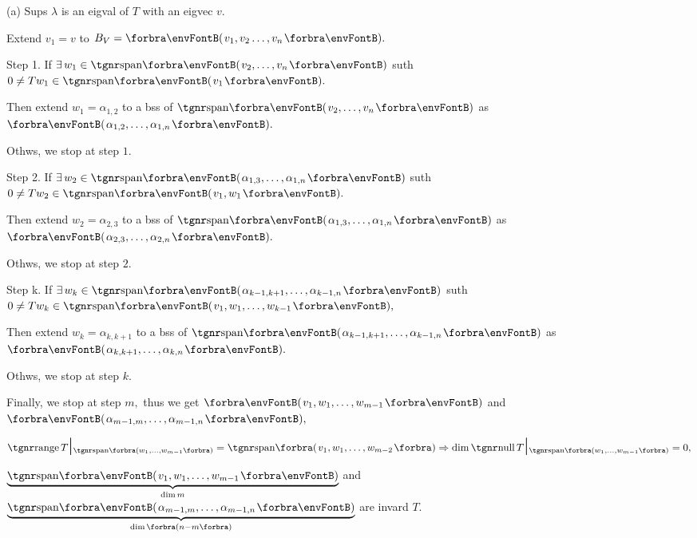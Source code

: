 \par\quad
(a) Sups $\lambda$ is an eigval of $T$ with an eigvec $v.$ \par\quad\Ha
Extend $v_1=v$ to $B_V=\Par{v_1,v_2\dots,v_n}.$\par\quad\Ha
{\tgbfx Step 1.} If $\exists\,w_1\in\Span{v_2,\dots,v_n}$ suth $0\neq Tw_1\in\Span{v_1}.$\par\quad\Ha
{} Then extend $w_1=\alpha_{1,2}$ to a bss of $\Span{v_2,\dots,v_n}$ as $\Par{\alpha_{1,2},\dots,\alpha_{1,n}}.$\par\quad\Ha
{} Othws, we stop at step $1.$\par\quad\Ha
{\tgbfx Step 2.} If $\exists\,w_2\in\Span{\alpha_{1,3},\dots,\alpha_{1,n}}$ suth $0\neq Tw_2\in\Span{v_1,w_1}.$\par\quad\Ha
{} Then extend $w_2=\alpha_{2,3}$ to a bss of $\Span{\alpha_{1,3},\dots,\alpha_{1,n}}$ as $\Par{\alpha_{2,3},\dots,\alpha_{2,n}}.$\par\quad\Ha
{} Othws, we stop at step $2.$\par\quad\Ha
{\tgbfx Step k.} If $\exists\,w_k\in\Span{\alpha_{k-1,k+1},\dots,\alpha_{k-1,n}}$ suth $0\neq Tw_k\in\Span{v_1,w_1,\dots,w_{k-1}},$\par\quad\Ha
{} Then extend $w_k=\alpha_{k,k+1}$ to a bss of $\Span{\alpha_{k-1,k+1},\dots,\alpha_{k-1,n}}$ as $\Par{\alpha_{k,k+1},\dots,\alpha_{k,n}}.$\par\quad\Ha
{} Othws, we stop at step $k.$\par\vspace{4pt}\quad\Ha
Finally, we stop at step $m,$ thus we get $\Par{v_1,w_1,\dots,w_{m-1}}$ and $\Par{\alpha_{m-1,m},\dots,\alpha_{m-1,n}},$\par\quad\Ha
$\range T\envFontLarge\mmid\envFontDefault{_{\Span[\SmallPar]{w_1,\dots,w_{m-1}}}}=\Span{v_1,w_1,\dots,w_{m-2}}\Rightarrow\dim\null T\envFontLarge\mmid\envFontDefault{_{\Span[\SmallPar]{w_1,\dots,w_{m-1}}}}=0,$\par\quad\Ha
$\underbrace{\Span{v_1,w_1,\dots,w_{m-1}}}_{\dim m}$ and $\underbrace{\Span{\alpha_{m-1,m},\dots,\alpha_{m-1,n}}}_{\dim \SmallPar{n-m}}$ are invard $T.$\par\quad\Ha
